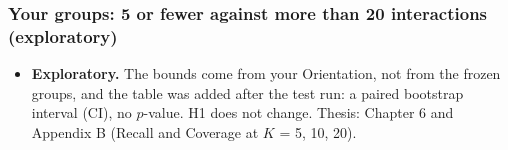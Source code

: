 \documentclass[aspectratio=169,11pt]{beamer}
\begin{document}
\begin{frame}
  \frametitle{Your groups: 5 or fewer against more than 20 interactions (exploratory)}
  \centering
  \footnotesize
  \par\vspace{2mm}
  \raggedright\small
  \begin{itemize}
    \item \textbf{Exploratory.} The bounds come from your Orientation, not from the frozen groups, and the table was added after the test run: a paired bootstrap interval (CI), no $p$-value. H1 does not change. Thesis: Chapter 6 and Appendix B (Recall and Coverage at $K$ = 5, 10, 20).

\end{itemize}
\end{frame}
\end{document}
